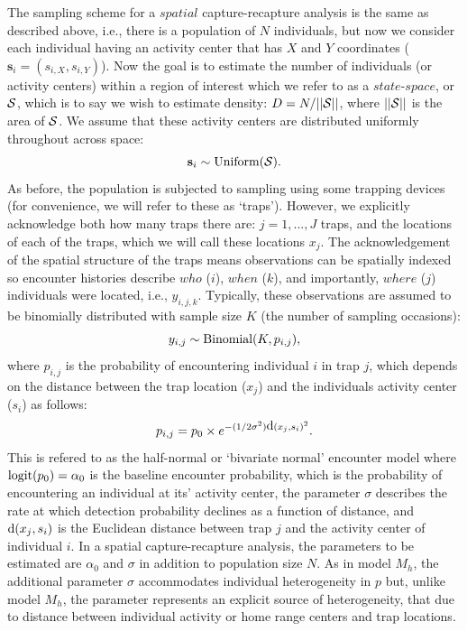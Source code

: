 \documentclass{book}
\begin{document}
The sampling scheme for a $spatial$ capture-recapture analysis is the
same as described above, i.e., there is a population of $N$
individuals, but now we consider each individual having an activity
center that has $X$ and $Y$ coordinates
($\textbf{s}_i=(s_{i,X},s_{i,Y})$). Now the goal is to estimate the
number of individuals (or activity centers) within a region of
interest which we refer to as a $state$-$space$, or ${\cal S}$, which
is to say we wish to estimate density: $D = N/||{\cal S}||$, where
$||{\cal S}||$ is the area of ${\cal S}$. We assume that these
activity centers are distributed uniformly throughout across space:
\[
\textbf{s}_i \sim \hbox{Uniform}({\cal S}).
\]
As before, the population is subjected to sampling using some trapping
devices (for convenience, we will refer to these as `traps'). However,
we explicitly acknowledge both how many traps there are: $j=1,...,J$
traps, and the locations of each of the traps, which we will call
these locations $x_j$. The acknowledgement of the spatial structure of
the traps means observations can be spatially indexed so encounter
histories describe $who$ ($i$), $when$ ($k$), and importantly, $where$
($j$) individuals were located, i.e., $y_{i,j,k}$. Typically, these
observations are assumed to be binomially distributed with sample size
$K$ (the number of sampling occasions):
\[
y_{i,j} \sim \hbox{Binomial}(K,p_{i,j}),
\]
where $p_{i,j}$ is the probability of encountering individual $i$ in
trap $j$, which depends on the distance between the trap location
($x_j$) and the individuals activity center ($s_i$) as follows:
\begin{equation}
p_{i,j} = p_0 \times e^{-(1/2\sigma^2) \hbox{d}(x_{j},s_{i})^{2}}.
\end{equation}
This is refered to as the half-normal or `bivariate normal' encounter
model where $\hbox{logit}(p_0) = \alpha_0$ is the baseline encounter
probability, which is the probability of encountering an individual at
its' activity center, the parameter $\sigma$ describes the rate at
which detection probability declines as a function of distance, and
$\hbox{d}(x_{j},s_{i})$ is the Euclidean distance between trap $j$ and
the activity center of individual $i$. In a spatial capture-recapture
analysis, the parameters to be estimated are $\alpha_0$ and $\sigma$
in addition to population size $N$.  As in model $M_h$, the additional
parameter $\sigma$ accommodates individual heterogeneity in $p$ but,
unlike model $M_h$, the parameter represents an explicit source of
heterogeneity, that due to distance between individual activity or
home range centers and trap locations.
\end{document}
